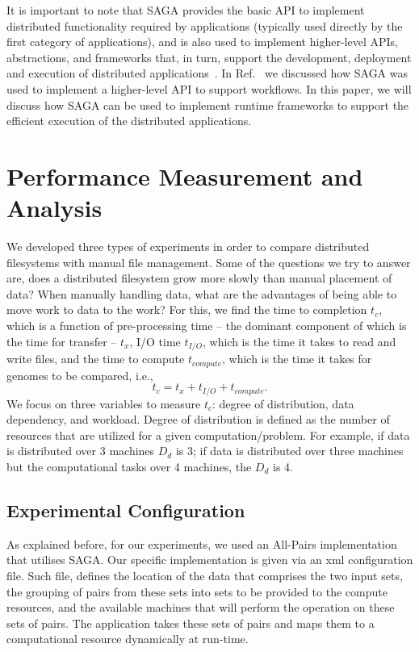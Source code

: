 \documentclass{rspublic}
\begin{document}
It is important to note that SAGA provides the basic API to implement
distributed functionality required by applications (typically used
directly by the first category of applications), and is also used to
implement higher-level APIs, abstractions, and frameworks that, in
turn, support the development, deployment and execution of distributed
applications~\cite{enkf-gmac09}. In Ref.~\cite{sagamontage09} we
discussed how SAGA was used to implement a higher-level API to support
workflows. In this paper, we will discuss how SAGA can be used to
implement runtime frameworks to support the efficient execution of the
distributed applications.


\section{Performance Measurement and Analysis} We developed three types
of experiments in order to compare distributed filesystems with manual
file management. Some of the questions we try to answer are, does a
distributed filesystem grow more slowly than manual placement of data?
When manually handling data, what are the advantages of being able to
move work to data to the work? For this, we find the time to completion
$t_c$, which is a function of pre-processing time -- the dominant
component of which is the time for transfer -- $t_x$, I/O time
$t_{I/O}$, which is the time it takes to read and write files, and the
time to compute $t_{compute}$, which is the time it takes for genomes to
be compared, i.e.,
 \begin{equation}
t_c = t_x + t_{I/O} + t_{compute}.
\end{equation}
We focus on three variables to measure $t_c$: degree of distribution,
data dependency, and workload. Degree of distribution is defined as
the number of resources that are utilized for a given
computation/problem. For example, if data is distributed over 3
machines $D_d$ is 3; if data is distributed over three machines but
the computational tasks over 4 machines, the $D_d$ is 4.

\subsection{Experimental Configuration}

As explained before, for our experiments, we used an All-Pairs implementation
that utilises SAGA. Our specific implementation is given via an xml
configuration file. Such file, defines the location of the data that comprises
the two input sets, the grouping of pairs from these sets into sets to be
provided to the compute resources, and the available machines that will perform
the operation on these sets of pairs. The application takes these sets of pairs
and maps them to a computational resource dynamically at run-time.
\end{document}

